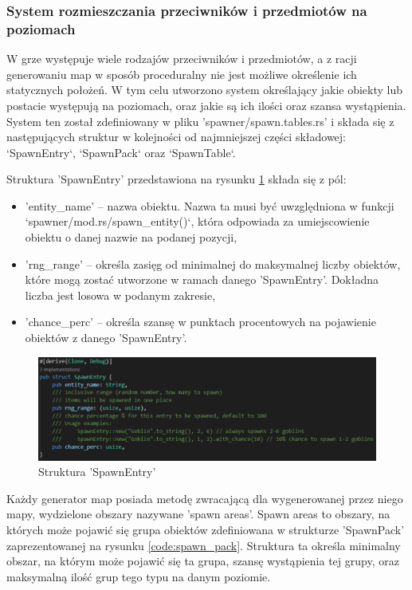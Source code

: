 \documentclass[12pt,twoside]{article}
\begin{document}
\subsubsection{System rozmieszczania przeciwników i przedmiotów na poziomach}
W grze występuje wiele rodzajów przeciwników i przedmiotów, a z racji generowaniu map w sposób proceduralny nie jest możliwe określenie ich statycznych położeń. W tym celu utworzono system określający jakie obiekty lub postacie występują na poziomach, oraz jakie są ich ilości oraz szansa wystąpienia. System ten został zdefiniowany w pliku 'spawner/spawn.tables.rs' i składa się z następujących struktur w kolejności od najmniejszej części składowej: `SpawnEntry`, `SpawnPack` oraz `SpawnTable`.
 
Struktura 'SpawnEntry' przedstawiona na rysunku \ref{code:spawn_entry} składa się z pól:
\begin{itemize}
	\item 'entity\_name' -- nazwa obiektu. Nazwa ta musi być uwzględniona w funkcji `spawner/mod.rs/spawn\_entity()`, która odpowiada za umiejscowienie obiektu o danej nazwie na podanej pozycji,
	\item 'rng\_range' -- określa zasięg od minimalnej do maksymalnej liczby obiektów, które mogą zostać utworzone w ramach danego 'SpawnEntry'. Dokładna liczba jest losowa w podanym zakresie,
	\item 'chance\_perc' -- określa szansę w punktach procentowych na pojawienie obiektów z danego 'SpawnEntry'.	
\end{itemize}

 
\FloatBarrier
\begin{figure}[h]
	\centering
	\includegraphics[width=16cm]{images/code/spawn_entry.png}
	\caption{Struktura 'SpawnEntry'}
	\label{code:spawn_entry}
\end{figure}
\FloatBarrier
 
Każdy generator map posiada metodę zwracającą dla wygenerowanej przez niego mapy, wydzielone obszary nazywane 'spawn areas'. Spawn areas to obszary, na których może pojawić się grupa obiektów zdefiniowana w strukturze 'SpawnPack' zaprezentowanej na rysunku \ref{code:spawn_pack}. Struktura ta określa minimalny obszar, na którym może pojawić się ta grupa, szansę wystąpienia tej grupy, oraz maksymalną ilość grup tego typu na danym poziomie.
 
\end{document}
